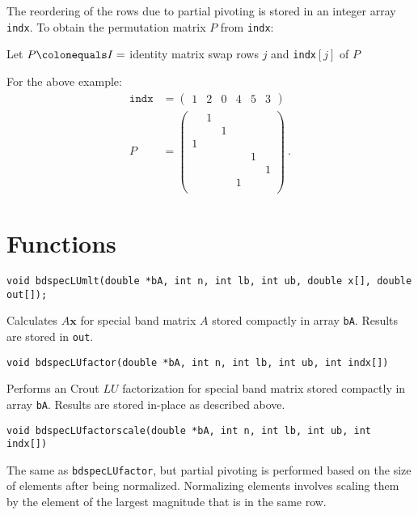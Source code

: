 \documentclass[10pt]{article}
\newcommand{\bfx}{\mathbf{x}}
\begin{document}
The reordering of the rows due to partial pivoting is stored in an integer array \texttt{indx}.
To obtain the permutation matrix $P$ from \texttt{indx}:
\begin{algorithmic}
  \STATE Let $P \colonequals I = $ identity matrix
  \STATE swap rows $j$ and \texttt{indx}$[j]$ of $P$
  \ENDFOR
\end{algorithmic}
For the above example:
\begin{align}
  \texttt{indx} &= \left(
  \begin{array}{cccccc}
    1 & 2 & 0 & 4 & 5 & 3
  \end{array}
  \right)
  \\
  P &=
  \left(
  \begin{array}{cccccc}
     &1& & & & \\
     & &1& & & \\
    1& & & & & \\
     & & & &1& \\
     & & & & &1 \\
     & & &1& &  \\
  \end{array}
  \right)
  ~.
\end{align}

\section{Functions}
\texttt{void bdspecLUmlt(double *bA, int n, int lb, int ub, double x[], double out[]);}

Calculates $A\bfx$ for special band matrix $A$ stored compactly in array
\texttt{bA}. Results are stored in \texttt{out}.
\vspace{1em}

\texttt{void bdspecLUfactor(double *bA, int n, int lb, int ub, int indx[])}

Performs an Crout $LU$ factorization for special band matrix stored compactly in array
\texttt{bA}. Results are stored in-place as described above.
\vspace{1em}

\texttt{void bdspecLUfactorscale(double *bA, int n, int lb, int ub, int indx[])}

The same as \texttt{bdspecLUfactor}, but partial pivoting is performed based on the size of
elements after being normalized. Normalizing elements involves scaling them by
the element of the largest magnitude that is in the same row.
\vspace{1em}
\end{document}
